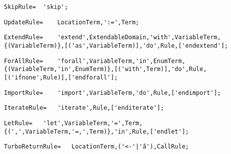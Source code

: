 \documentclass{article}
\begin{document}
    \begin{flushleft}
    \begin{lstlisting}[mathescape=true, breaklines=true]
     SkipRule= 	'skip';
    \end{lstlisting}
    \end{flushleft}
    \begin{flushleft}
    \begin{lstlisting}[mathescape=true, breaklines=true]
     UpdateRule= 	LocationTerm,':=',Term;
    \end{lstlisting}
    \end{flushleft}
    \begin{flushleft}
    \begin{lstlisting}[mathescape=true, breaklines=true]
     ExtendRule= 	'extend',ExtendableDomain,'with',VariableTerm,{(VariableTerm)},[('as',VariableTerm)],'do',Rule,['endextend'];
    \end{lstlisting}
    \end{flushleft}
    \begin{flushleft}
    \begin{lstlisting}[mathescape=true, breaklines=true]
     ForAllRule= 	'forall',VariableTerm,'in',EnumTerm,{(VariableTerm,'in',EnumTerm)},[('with',Term)],'do',Rule,[('ifnone',Rule)],['endforall'];
    \end{lstlisting}
    \end{flushleft}
    \begin{flushleft}
    \begin{lstlisting}[mathescape=true, breaklines=true]
     ImportRule= 	'import',VariableTerm,'do',Rule,['endimport'];
    \end{lstlisting}
    \end{flushleft}
    \begin{flushleft}
    \begin{lstlisting}[mathescape=true, breaklines=true]
     IterateRule= 	'iterate',Rule,['enditerate'];
    \end{lstlisting}
    \end{flushleft}
    \begin{flushleft}
    \begin{lstlisting}[mathescape=true, breaklines=true]
     LetRule= 	'let',VariableTerm,'=',Term,{(',',VariableTerm,'=,',Term)},'in',Rule,['endlet'];
    \end{lstlisting}
    \end{flushleft}
    \begin{flushleft}
    \begin{lstlisting}[mathescape=true, breaklines=true]
     TurboReturnRule= 	LocationTerm,('<-'|'â'),CallRule;
    \end{lstlisting}
    \end{flushleft}
\end{document}
